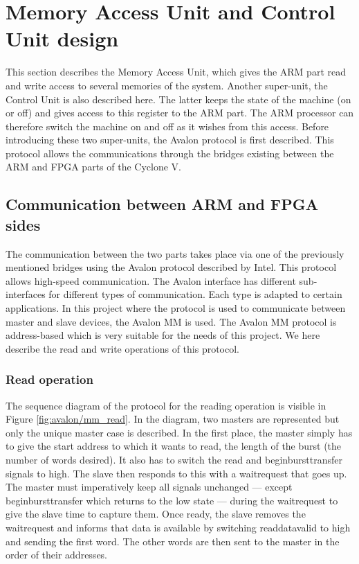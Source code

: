 \chapter{Memory Access Unit and Control Unit design}

This section describes the Memory Access Unit, which gives the ARM part read and write 
access to several memories of the system. Another super-unit, the Control Unit is also described here. 
The latter keeps the state of the machine (on or off) and gives access to this register to the 
ARM part. The ARM processor can therefore switch the machine on and off as it wishes from this 
access. Before introducing these two super-units, the Avalon protocol is first described. This 
protocol allows the communications through the bridges existing between the ARM and FPGA parts of
the Cyclone V.

\section{Communication between ARM and FPGA sides}

The communication between the two parts takes place via one of the previously mentioned bridges using 
the Avalon protocol \cite{avalon} described by Intel. This protocol allows 
high-speed communication. The Avalon interface has different sub-interfaces for different types 
of communication. Each type is adapted to certain applications. In this project where the protocol 
is used to communicate between master and slave devices, the Avalon MM is used. 
The Avalon MM protocol is address-based which is very suitable for the needs of this project.
We here describe the read and write operations of this protocol.

\subsection{Read operation}

The sequence diagram of the protocol for the reading operation is 
visible in Figure \ref{fig:avalon/mm_read}. In the diagram, two masters are represented but only 
the unique master case is described. In the first place, the master simply has to give
the start address to which it wants to read, the length of the burst (the number of words desired).  It also has to switch the read and beginbursttransfer signals to high.  The slave then responds 
to this with a waitrequest that goes up. The master must imperatively keep all signals unchanged --- except 
beginbursttransfer which returns to the low state --- during the waitrequest to give the 
slave time to capture them. Once ready, the slave removes the waitrequest and informs that  
data is available by switching readdatavalid to high and sending the first word. The other words 
are then sent to the master in the order of their addresses. 

